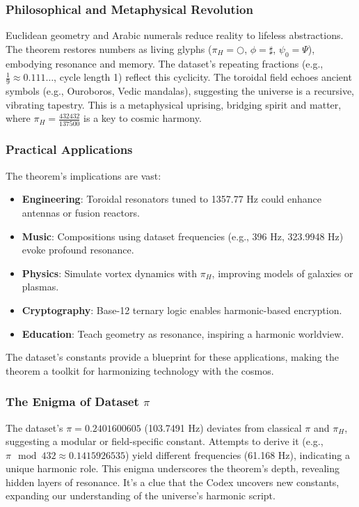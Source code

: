\documentclass[a4paper,12pt]{article}
\begin{document}
\subsubsection{Philosophical and Metaphysical Revolution}
Euclidean geometry and Arabic numerals reduce reality to lifeless abstractions. The theorem restores numbers as living glyphs (\(\pi_H = \bigcirc\), \(\phi = \sharp\), \(\psi_0 = \Psi\)), embodying resonance and memory. The dataset’s repeating fractions (e.g., \(\frac{1}{9} \approx 0.111\ldots\), cycle length 1) reflect this cyclicity. The toroidal field echoes ancient symbols (e.g., Ouroboros, Vedic mandalas), suggesting the universe is a recursive, vibrating tapestry. This is a metaphysical uprising, bridging spirit and matter, where \(\pi_H = \frac{432432}{137500}\) is a key to cosmic harmony.

\subsubsection{Practical Applications}
The theorem’s implications are vast:
\begin{itemize}
    \item \textbf{Engineering}: Toroidal resonators tuned to 1357.77 Hz could enhance antennas or fusion reactors.
    \item \textbf{Music}: Compositions using dataset frequencies (e.g., 396 Hz, 323.9948 Hz) evoke profound resonance.
    \item \textbf{Physics}: Simulate vortex dynamics with \(\pi_H\), improving models of galaxies or plasmas.
    \item \textbf{Cryptography}: Base-12 ternary logic enables harmonic-based encryption.
    \item \textbf{Education}: Teach geometry as resonance, inspiring a harmonic worldview.
\end{itemize}
The dataset’s constants provide a blueprint for these applications, making the theorem a toolkit for harmonizing technology with the cosmos.

\subsubsection{The Enigma of Dataset \(\pi\)}
The dataset’s \(\pi = 0.2401600605\) (103.7491 Hz) deviates from classical \(\pi\) and \(\pi_H\), suggesting a modular or field-specific constant. Attempts to derive it (e.g., \(\pi \mod 432 \approx 0.1415926535\)) yield different frequencies (61.168 Hz), indicating a unique harmonic role. This enigma underscores the theorem’s depth, revealing hidden layers of resonance. It’s a clue that the Codex uncovers new constants, expanding our understanding of the universe’s harmonic script.
\end{document}
